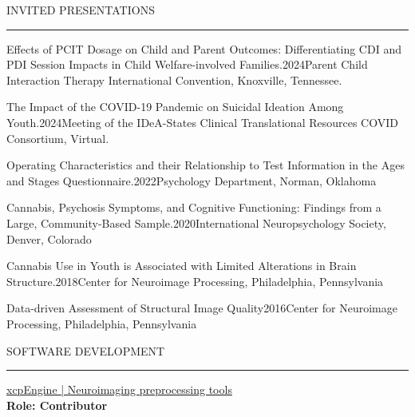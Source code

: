 \documentclass{resume} %
\renewenvironment{rSection}[1]{
\sectionskip
\textcolor{CarnegieMellonRed}{\MakeUppercase{#1}}
\sectionlineskip
\hrule
\begin{list}{}{
\setlength{\leftmargin}{1.5em}
}
\item[]
}{
\end{list}
}
\begin{document}
\begin{rSection}{Invited Presentations}
\begin{rSubsectionPres}{Effects of PCIT Dosage on Child and Parent Outcomes: Differentiating CDI and PDI Session Impacts in Child Welfare-involved Families.}{2024}{Parent Child Interaction Therapy International Convention, Knoxville, Tennessee.} 
\end{rSubsectionPres}
\begin{rSubsectionPres}{The Impact of the COVID-19 Pandemic on Suicidal Ideation Among Youth.}{2024}{Meeting of the IDeA-States Clinical Translational Resources COVID Consortium,  Virtual.} 
\end{rSubsectionPres}
\begin{rSubsectionPres}{Operating Characteristics and their Relationship to Test Information in the Ages and Stages Questionnaire.}{2022}{Psychology Department, Norman, Oklahoma} 
\end{rSubsectionPres}
\begin{rSubsectionPres}{Cannabis, Psychosis Symptoms, and Cognitive Functioning: Findings from a Large, Community-Based Sample.}{2020}{International Neuropsychology Society, Denver, Colorado} 
\end{rSubsectionPres}
\begin{rSubsectionPres}{Cannabis Use in Youth is Associated with Limited Alterations in Brain Structure.}{2018}{Center for Neuroimage Processing, Philadelphia, Pennsylvania} 
\end{rSubsectionPres}
\begin{rSubsectionPres}{Data-driven Assessment of Structural Image Quality}{2016}{Center for Neuroimage Processing, Philadelphia, Pennsylvania} 
\end{rSubsectionPres}
\end{rSection}

\begin{rSection}{Software Development} \itemsep -2pt
{\href{https://github.com/PennLINC/xcpEngine}{xcpEngine | Neuroimaging preprocessing tools}}\\
{\bf{ \small{Role:}} Contributor}
\end{rSection}
\end{document}
